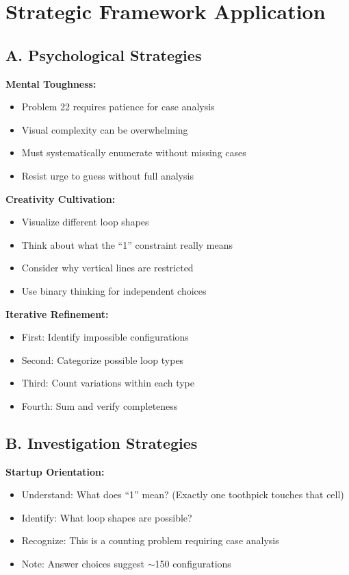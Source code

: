 \documentclass[12pt]{article}
\begin{document}
\section{Strategic Framework Application}

\begin{strategicbox}

\subsection*{A. Psychological Strategies}

\textbf{Mental Toughness:}
\begin{itemize}
    \item Problem 22 requires patience for case analysis
    \item Visual complexity can be overwhelming
    \item Must systematically enumerate without missing cases
    \item Resist urge to guess without full analysis
\end{itemize}

\textbf{Creativity Cultivation:}
\begin{itemize}
    \item Visualize different loop shapes
    \item Think about what the ``1'' constraint really means
    \item Consider why vertical lines are restricted
    \item Use binary thinking for independent choices
\end{itemize}

\textbf{Iterative Refinement:}
\begin{itemize}
    \item First: Identify impossible configurations
    \item Second: Categorize possible loop types
    \item Third: Count variations within each type
    \item Fourth: Sum and verify completeness
\end{itemize}

\subsection*{B. Investigation Strategies}

\textbf{Startup Orientation:}
\begin{itemize}
    \item Understand: What does ``1'' mean? (Exactly one toothpick touches that cell)
    \item Identify: What loop shapes are possible?
    \item Recognize: This is a counting problem requiring case analysis
    \item Note: Answer choices suggest $\sim$150 configurations
\end{itemize}


\end{strategicbox}
\end{document}
